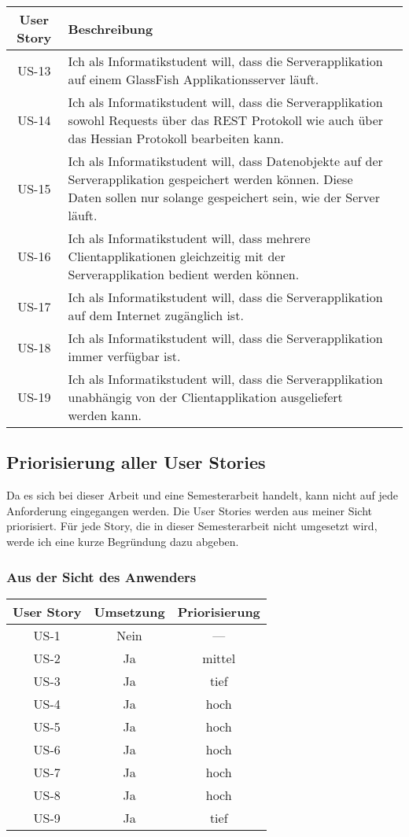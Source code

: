 \documentclass[listof=totocnumbered, bibliography=totocnumbered]{scrreprt}
\begin{document}
  \begin{tabular}{cp{13cm}l}
    \toprule
    User Story & Beschreibung \\
    \midrule
    US-13 & Ich als Informatikstudent will, dass die Serverapplikation auf einem
    GlassFish Applikationsserver läuft. \\
    US-14 & Ich als Informatikstudent will, dass die Serverapplikation sowohl
    Requests über das \ac{REST} Protokoll wie auch über das Hessian
    Protokoll bearbeiten kann. \\
    US-15 & Ich als Informatikstudent will, dass Datenobjekte auf der
    Serverapplikation gespeichert werden können. Diese Daten sollen nur solange
    gespeichert sein, wie der Server läuft. \\
    US-16 & Ich als Informatikstudent will, dass mehrere Clientapplikationen
    gleichzeitig mit der Serverapplikation bedient werden können. \\
    US-17 & Ich als Informatikstudent will, dass die Serverapplikation
    auf dem Internet zugänglich ist. \\
    US-18 & Ich als Informatikstudent will, dass die Serverapplikation immer
    verfügbar ist. \\
    US-19 & Ich als Informatikstudent will, dass die Serverapplikation
    unabhängig von der Clientapplikation ausgeliefert werden kann. \\
    \bottomrule
  \end{tabular}
  
  \subsection{Priorisierung aller User Stories}
  
  Da es sich bei dieser Arbeit und eine Semesterarbeit handelt, kann nicht auf
  jede Anforderung eingegangen werden. Die User Stories werden aus meiner Sicht
  priorisiert. Für jede Story, die in dieser Semesterarbeit nicht umgesetzt
  wird, werde ich eine kurze Begründung dazu abgeben.
  
  \subsubsection{Aus der Sicht des Anwenders}
  
  \begin{tabular}{ccc}
    \toprule
    User Story & Umsetzung & Priorisierung \\
    \midrule
    US-1 & Nein & --- \\
    US-2 & Ja & mittel \\
    US-3 & Ja & tief \\
    US-4 & Ja & hoch \\
    US-5 & Ja & hoch \\
    US-6 & Ja & hoch \\
    US-7 & Ja & hoch \\
    US-8 & Ja & hoch \\
    US-9 & Ja & tief \\
    \bottomrule
  \end{tabular}
  
\end{document}
